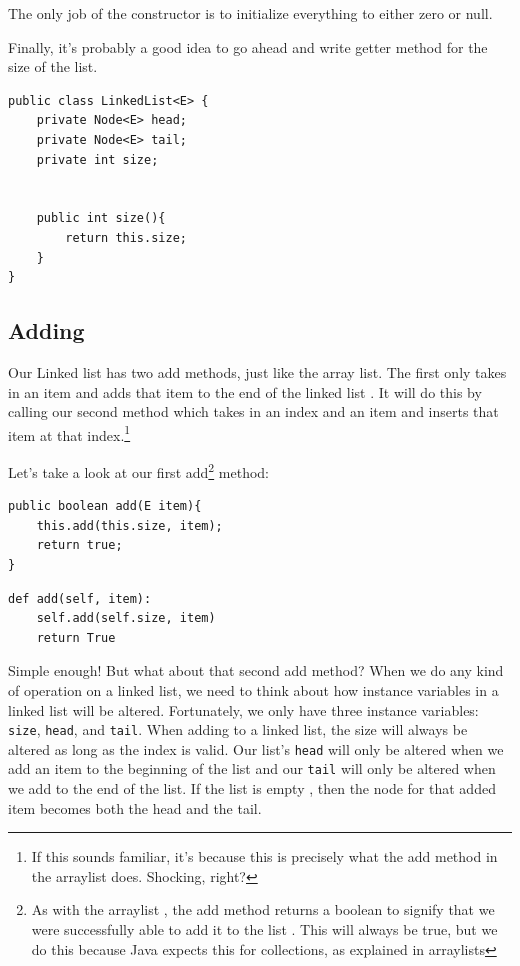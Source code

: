 \documentclass[10pt,a4paper]{book}
\begin{document}
The only job of the constructor is to initialize everything to either zero or null.

Finally, it's probably a good idea to go ahead and write getter method for the size of the list.

\begin{verbatim}
public class LinkedList<E> { 
	private Node<E> head;
	private Node<E> tail;
	private int size;
	
	
	public int size(){
		return this.size;
	}
}
\end{verbatim}






\subsection{Adding}
Our Linked list has two add methods, just like the array list.  The first only takes in an item and adds that item to the end of the linked list . It will do this by calling our second method which takes in an index and an item and inserts that item at that index.\footnote{If this sounds familiar, it's because this is precisely what the add method in the arraylist does. Shocking, right?}

Let's take a look at our first add\footnote{As with the arraylist , the add method returns a boolean to signify that we were successfully able to add it to the list . This will always be true, but we do this because Java expects this for collections, as explained in arraylists } method:

\begin{verbatim}
public boolean add(E item){
	this.add(this.size, item);
	return true;
}
\end{verbatim}

\begin{verbatim}
def add(self, item):
	self.add(self.size, item)
	return True
\end{verbatim}

Simple enough!  But what about that second add method?
When we do any kind of operation on a linked list, we need to think about how instance variables in a linked list will be altered. 
Fortunately, we only have three instance variables: \texttt{size}, \texttt{head}, and \texttt{tail}.
When adding to a linked list, the size will always be altered as long as the index is valid.
Our list's \texttt{head} will only be altered when we add an item to the beginning of the list and our \texttt{tail} will only be altered when we add to the end of the list.  If the list is empty , then the node for that added item becomes both the head and the tail.
\end{document}
